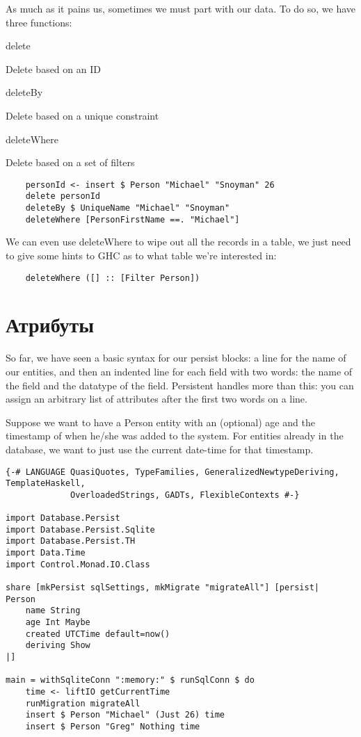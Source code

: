 As much as it pains us, sometimes we must part with our data. To do so, we have three functions:

delete

Delete based on an ID

deleteBy

Delete based on a unique constraint

deleteWhere

Delete based on a set of filters

\begin{lstlisting}
    personId <- insert $ Person "Michael" "Snoyman" 26
    delete personId
    deleteBy $ UniqueName "Michael" "Snoyman"
    deleteWhere [PersonFirstName ==. "Michael"]
\end{lstlisting}%

We can even use deleteWhere to wipe out all the records in a table, we just need to give some hints to GHC as to what table we're interested in:

\begin{lstlisting}
    deleteWhere ([] :: [Filter Person])
\end{lstlisting}

\section{Атрибуты} %

So far, we have seen a basic syntax for our persist blocks: a line for the name of our entities, and then an indented line for each field with two words: the name of the field and the datatype of the field. Persistent handles more than this: you can assign an arbitrary list of attributes after the first two words on a line.

Suppose we want to have a Person entity with an (optional) age and the timestamp of when he/she was added to the system. For entities already in the database, we want to just use the current date-time for that timestamp.

\begin{lstlisting}
{-# LANGUAGE QuasiQuotes, TypeFamilies, GeneralizedNewtypeDeriving, TemplateHaskell,
             OverloadedStrings, GADTs, FlexibleContexts #-}

import Database.Persist
import Database.Persist.Sqlite
import Database.Persist.TH
import Data.Time
import Control.Monad.IO.Class

share [mkPersist sqlSettings, mkMigrate "migrateAll"] [persist|
Person
    name String
    age Int Maybe
    created UTCTime default=now()
    deriving Show
|]

main = withSqliteConn ":memory:" $ runSqlConn $ do
    time <- liftIO getCurrentTime
    runMigration migrateAll
    insert $ Person "Michael" (Just 26) time
    insert $ Person "Greg" Nothing time
\end{lstlisting}%

